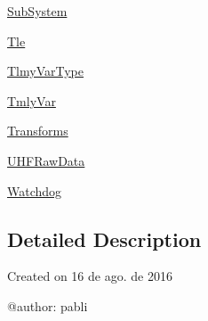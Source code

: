\begin{DoxyCompactItemize}
 \hyperlink{namespace_ground_segment_1_1models_1_1_sub_system}{Sub\+System}
\item 
 \hyperlink{namespace_ground_segment_1_1models_1_1_tle}{Tle}
\item 
 \hyperlink{namespace_ground_segment_1_1models_1_1_tlmy_var_type}{Tlmy\+Var\+Type}
\item 
 \hyperlink{namespace_ground_segment_1_1models_1_1_tmly_var}{Tmly\+Var}
\item 
 \hyperlink{namespace_ground_segment_1_1models_1_1_transforms}{Transforms}
\item 
 \hyperlink{namespace_ground_segment_1_1models_1_1_u_h_f_raw_data}{U\+H\+F\+Raw\+Data}
\item 
 \hyperlink{namespace_ground_segment_1_1models_1_1_watchdog}{Watchdog}
\end{DoxyCompactItemize}


\subsection{Detailed Description}
\begin{DoxyVerb}Created on 16 de ago. de 2016

@author: pabli
\end{DoxyVerb}
 